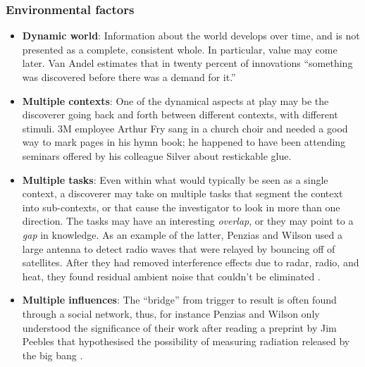 \subsubsection*{Environmental factors}

\begin{itemize}
\item \textbf{Dynamic world}: Information about the world develops
  over time, and is not presented as a complete, consistent whole.  In
  particular, value may come later.  Van Andel
  \citeyear[p. 643]{van1994anatomy} estimates that in twenty percent
  of innovations ``something was discovered before there was a demand
  for it.''
%
\item \textbf{Multiple contexts}: One of the dynamical aspects at play
  may be the discoverer going back and forth between different
  contexts, with different stimuli.  3M employee Arthur Fry sang in a
  church choir and needed a good way to mark pages in his hymn book;
  he happened to have been attending seminars offered by his colleague
  Silver about restickable glue.
%
\item \textbf{Multiple tasks}: Even within what would typically be
  seen as a single context, a discoverer may take on multiple tasks
  that segment the context into sub-contexts, or that cause the
  investigator to look in more than one direction.  The tasks may have
  an interesting \emph{overlap}, or they may point to a \emph{gap} in
  knowledge.  As an example of the latter, Penzias and Wilson used a
  large antenna to detect radio waves that were relayed by bouncing
  off of satellites.  After they had removed interference effects due
  to radar, radio, and heat, they found residual ambient noise that
  couldn't be eliminated \cite{wiki:cosmic-radiation}.
%
\item \textbf{Multiple influences}: The ``bridge'' from trigger to
  result is often found through a social network, thus, for instance
  Penzias and Wilson only understood the significance of their work
  after reading a preprint by Jim Peebles that hypothesised the
  possibility of measuring radiation released by the big bang
  \cite{wiki:cosmic-radiation}.
%
\end{itemize}
